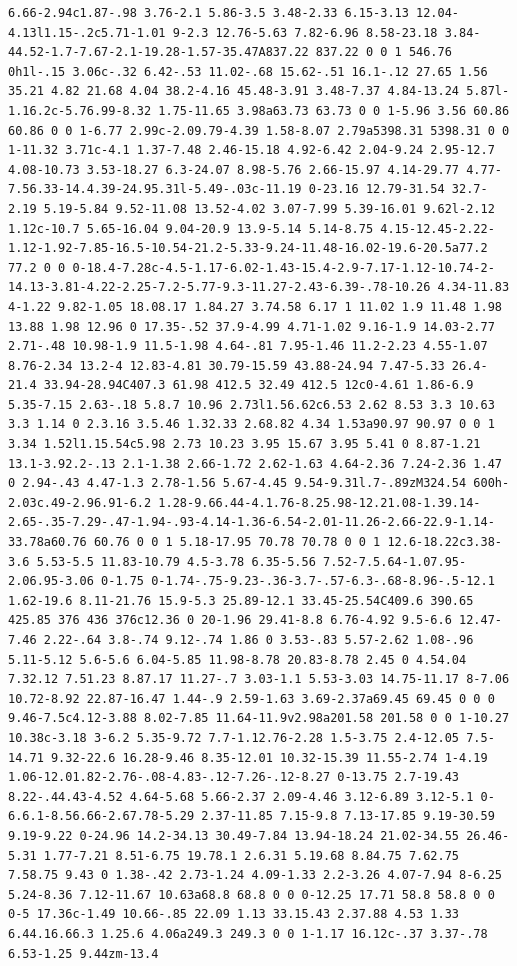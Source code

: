 \documentclass[11pt]{article}
\begin{document}
\begin{enumerate}
\begin{verbatim}
6.66-2.94c1.87-.98 3.76-2.1 5.86-3.5 3.48-2.33 6.15-3.13 12.04-4.13l1.15-.2c5.71-1.01 9-2.3 12.76-5.63 7.82-6.96 8.58-23.18 3.84-44.52-1.7-7.67-2.1-19.28-1.57-35.47A837.22 837.22 0 0 1 546.76 0h1l-.15 3.06c-.32 6.42-.53 11.02-.68 15.62-.51 16.1-.12 27.65 1.56 35.21 4.82 21.68 4.04 38.2-4.16 45.48-3.91 3.48-7.37 4.84-13.24 5.87l-1.16.2c-5.76.99-8.32 1.75-11.65 3.98a63.73 63.73 0 0 1-5.96 3.56 60.86 60.86 0 0 1-6.77 2.99c-2.09.79-4.39 1.58-8.07 2.79a5398.31 5398.31 0 0 1-11.32 3.71c-4.1 1.37-7.48 2.46-15.18 4.92-6.42 2.04-9.24 2.95-12.7 4.08-10.73 3.53-18.27 6.3-24.07 8.98-5.76 2.66-15.97 4.14-29.77 4.77-7.56.33-14.4.39-24.95.31l-5.49-.03c-11.19 0-23.16 12.79-31.54 32.7-2.19 5.19-5.84 9.52-11.08 13.52-4.02 3.07-7.99 5.39-16.01 9.62l-2.12 1.12c-10.7 5.65-16.04 9.04-20.9 13.9-5.14 5.14-8.75 4.15-12.45-2.22-1.12-1.92-7.85-16.5-10.54-21.2-5.33-9.24-11.48-16.02-19.6-20.5a77.2 77.2 0 0 0-18.4-7.28c-4.5-1.17-6.02-1.43-15.4-2.9-7.17-1.12-10.74-2-14.13-3.81-4.22-2.25-7.2-5.77-9.3-11.27-2.43-6.39-.78-10.26 4.34-11.83 4-1.22 9.82-1.05 18.08.17 1.84.27 3.74.58 6.17 1 11.02 1.9 11.48 1.98 13.88 1.98 12.96 0 17.35-.52 37.9-4.99 4.71-1.02 9.16-1.9 14.03-2.77 2.71-.48 10.98-1.9 11.5-1.98 4.64-.81 7.95-1.46 11.2-2.23 4.55-1.07 8.76-2.34 13.2-4 12.83-4.81 30.79-15.59 43.88-24.94 7.47-5.33 26.4-21.4 33.94-28.94C407.3 61.98 412.5 32.49 412.5 12c0-4.61 1.86-6.9 5.35-7.15 2.63-.18 5.8.7 10.96 2.73l1.56.62c6.53 2.62 8.53 3.3 10.63 3.3 1.14 0 2.3.16 3.5.46 1.32.33 2.68.82 4.34 1.53a90.97 90.97 0 0 1 3.34 1.52l1.15.54c5.98 2.73 10.23 3.95 15.67 3.95 5.41 0 8.87-1.21 13.1-3.92.2-.13 2.1-1.38 2.66-1.72 2.62-1.63 4.64-2.36 7.24-2.36 1.47 0 2.94-.43 4.47-1.3 2.78-1.56 5.67-4.45 9.54-9.31l.7-.89zM324.54 600h-2.03c.49-2.96.91-6.2 1.28-9.66.44-4.1.76-8.25.98-12.21.08-1.39.14-2.65-.35-7.29-.47-1.94-.93-4.14-1.36-6.54-2.01-11.26-2.66-22.9-1.14-33.78a60.76 60.76 0 0 1 5.18-17.95 70.78 70.78 0 0 1 12.6-18.22c3.38-3.6 5.53-5.5 11.83-10.79 4.5-3.78 6.35-5.56 7.52-7.5.64-1.07.95-2.06.95-3.06 0-1.75 0-1.74-.75-9.23-.36-3.7-.57-6.3-.68-8.96-.5-12.1 1.62-19.6 8.11-21.76 15.9-5.3 25.89-12.1 33.45-25.54C409.6 390.65 425.85 376 436 376c12.36 0 20-1.96 29.41-8.8 6.76-4.92 9.5-6.6 12.47-7.46 2.22-.64 3.8-.74 9.12-.74 1.86 0 3.53-.83 5.57-2.62 1.08-.96 5.11-5.12 5.6-5.6 6.04-5.85 11.98-8.78 20.83-8.78 2.45 0 4.54.04 7.32.12 7.51.23 8.87.17 11.27-.7 3.03-1.1 5.53-3.03 14.75-11.17 8-7.06 10.72-8.92 22.87-16.47 1.44-.9 2.59-1.63 3.69-2.37a69.45 69.45 0 0 0 9.46-7.5c4.12-3.88 8.02-7.85 11.64-11.9v2.98a201.58 201.58 0 0 1-10.27 10.38c-3.18 3-6.2 5.35-9.72 7.7-1.12.76-2.28 1.5-3.75 2.4-12.05 7.5-14.71 9.32-22.6 16.28-9.46 8.35-12.01 10.32-15.39 11.55-2.74 1-4.19 1.06-12.01.82-2.76-.08-4.83-.12-7.26-.12-8.27 0-13.75 2.7-19.43 8.22-.44.43-4.52 4.64-5.68 5.66-2.37 2.09-4.46 3.12-6.89 3.12-5.1 0-6.6.1-8.56.66-2.67.78-5.29 2.37-11.85 7.15-9.8 7.13-17.85 9.19-30.59 9.19-9.22 0-24.96 14.2-34.13 30.49-7.84 13.94-18.24 21.02-34.55 26.46-5.31 1.77-7.21 8.51-6.75 19.78.1 2.6.31 5.19.68 8.84.75 7.62.75 7.58.75 9.43 0 1.38-.42 2.73-1.24 4.09-1.33 2.2-3.26 4.07-7.94 8-6.25 5.24-8.36 7.12-11.67 10.63a68.8 68.8 0 0 0-12.25 17.71 58.8 58.8 0 0 0-5 17.36c-1.49 10.66-.85 22.09 1.13 33.15.43 2.37.88 4.53 1.33 6.44.16.66.3 1.25.6 4.06a249.3 249.3 0 0 1-1.17 16.12c-.37 3.37-.78 6.53-1.25 9.44zm-13.4 
\end{verbatim}
\end{enumerate}
\end{document}
